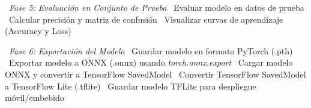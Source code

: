 \begin{algorithmic}[1]
\State~\textit{Fase 5: Evaluación en Conjunto de Prueba}{}
\State~Evaluar modelo en datos de prueba
\State~Calcular precisión y matriz de confusión
\State~Visualizar curvas de aprendizaje (Accuracy y Loss)

\State~\textit{Fase 6: Exportación del Modelo}{}
\State~Guardar modelo en formato PyTorch (.pth)
\State~Exportar modelo a ONNX (.onnx) usando \textit{torch.onnx.export}
\State~Cargar modelo ONNX y convertir a TensorFlow SavedModel
\State~Convertir TensorFlow SavedModel a TensorFlow Lite (.tflite)
\State~Guardar modelo TFLite para despliegue móvil/embebido
\end{algorithmic}

